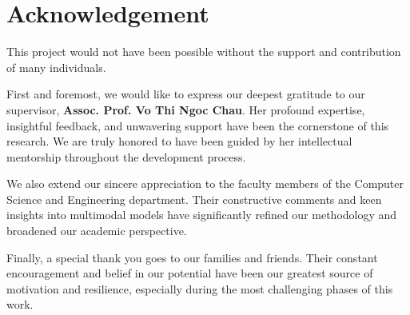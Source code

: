 \section*{Acknowledgement}

\noindent This project would not have been possible without the support and contribution of many individuals. 

\noindent First and foremost, we would like to express our deepest gratitude to our supervisor, \textbf{Assoc. Prof. Vo Thi Ngoc Chau}. Her profound expertise, insightful feedback, and unwavering support have been the cornerstone of this research. We are truly honored to have been guided by her intellectual mentorship throughout the development process.

\vspace{0.3cm}
\noindent We also extend our sincere appreciation to the faculty members of the Computer Science and Engineering department. Their constructive comments and keen insights into multimodal models have significantly refined our methodology and broadened our academic perspective.

\vspace{0.3cm}
\noindent Finally, a special thank you goes to our families and friends. Their constant encouragement and belief in our potential have been our greatest source of motivation and resilience, especially during the most challenging phases of this work.

\clearpage